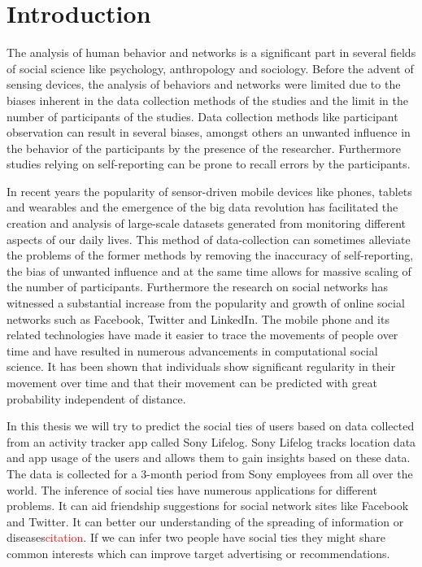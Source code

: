 \chapter{Introduction}
\label{chap:Introduction}

The analysis of human behavior and networks is a significant part in several fields of social science like psychology, anthropology and sociology. Before the advent of sensing devices, the analysis of behaviors and networks were limited due to the biases inherent in the data collection methods of the studies and the limit in the number of participants of the studies. Data collection methods like participant observation can result in several biases, amongst others an unwanted influence in the behavior of the participants by the presence of the researcher\cite{rosenthal1966experimenter}. Furthermore studies relying on self-reporting can be prone to recall errors by the participants\cite{stone1999science}.

In recent years the popularity of sensor-driven mobile devices like phones, tablets and wearables and the emergence of the big data revolution has facilitated the creation and analysis of large-scale datasets generated from monitoring different aspects of our daily lives\cite{lazer2009life}. This method of data-collection can sometimes alleviate the problems of the former methods by removing the inaccuracy of self-reporting, the bias of unwanted influence and at the same time allows for massive scaling of the number of participants. Furthermore the research on social networks has witnessed a substantial increase from the popularity and growth of online social networks such as Facebook, Twitter and LinkedIn\cite{social_networks}. The mobile phone and its related technologies have made it easier to trace the movements of people over time and have resulted in numerous advancements in computational social science. It has been shown that individuals show significant regularity in their movement over time\cite{gonzalez2008understanding} and that their movement can be predicted with great probability independent of distance\cite{song2010limits}.

In this thesis we will try to predict the social ties of users based on data collected from an activity tracker app called Sony Lifelog\cite{sonyLifeLog}. Sony Lifelog tracks location data and app usage of the users and allows them to gain insights based on these data. The data is collected for a 3-month period from Sony employees from all over the world.
The inference of social ties have numerous applications for different problems. It can aid friendship suggestions for social network sites like Facebook and Twitter. It can better our understanding of the spreading of information or diseases\textcolor{red}{citation}. If we can infer two people have social ties they might share common interests which can improve target advertising or recommendations\cite{yu2015investigating}.

